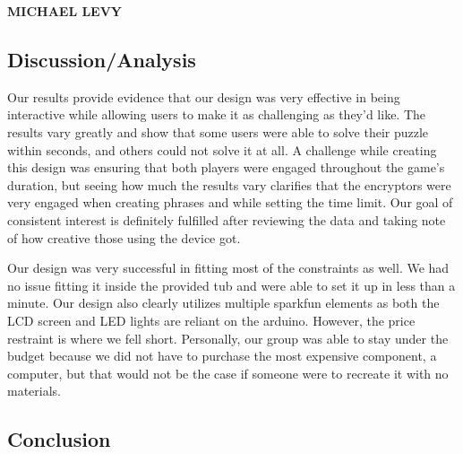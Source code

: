 \documentclass[conference]{IEEEtran}
\begin{document}
\newpage


\vspace{10pt} \LARGE \textbf{MICHAEL LEVY} \normalsize

\subsection{Discussion/Analysis}

\par Our results provide evidence that our design was very effective in being interactive while allowing users to make it as challenging as they’d like. The results vary greatly and show that some users were able to solve their puzzle within seconds, and others could not solve it at all. A challenge while creating this design was ensuring that both players were engaged throughout the game’s duration, but seeing how much the results vary clarifies that the encryptors were very engaged when creating phrases and while setting the time limit. Our goal of consistent interest is definitely fulfilled after reviewing the data and taking note of how creative those using the device got. 
    \par Our design was very successful in fitting most of the constraints as well. We had no issue fitting it inside the provided tub and were able to set it up in less than a minute. Our design also clearly utilizes multiple sparkfun elements as both the LCD screen and LED lights are reliant on the arduino. However, the price restraint is where we fell short. Personally, our group was able to stay under the budget because we did not have to purchase the most expensive component, a computer, but that would not be the case if someone were to recreate it with no materials. 

\subsection{Conclusion}
\end{document}
